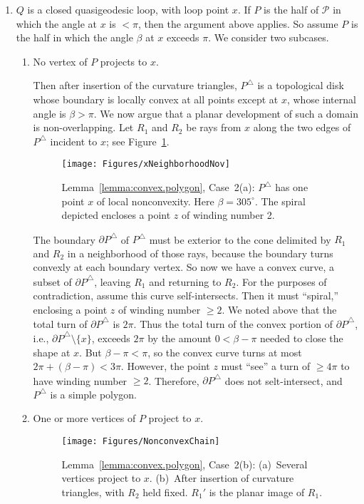 \pdfoutput=1  \documentclass[]{article}
\newcommand{\hide}[1]{}
\newcommand{\ABox}{
\raisebox{3pt}{\framebox[6pt]{\rule{6pt}{0pt}}}
}
\newenvironment{proof}{{\bf Proof:}}{\hfill\ABox}
\newcommand{\figlab}[1]{\label{fig:#1}}
\newcommand{\lemref}[1]{\ref{lemma:#1}}
\newcommand{\figref}[1]{\ref{fig:#1}}
\def\P{{\mathcal P}}
\def\o{{\omega}}
\def\b{{\beta}}
\def\bP{{\partial P}}
\begin{document}
\begin{proof}
\begin{enumerate}
\item $Q$ is a closed quasigeodesic loop, with loop point $x$.
If $P$ is the half of $\P$ in which the angle at $x$ is ${<}\pi$,
then the argument above applies.
So assume $P$ is the half in which the angle $\b$ at $x$ exceeds $\pi$.
We consider two subcases.

\begin{enumerate}
\item No vertex of $P$ projects to $x$.

Then after insertion of the curvature triangles, $P^\triangle$ is a topological
disk whose boundary is locally convex at all points except at $x$,
whose internal angle is $\b > \pi$.
We now argue that a planar development of such a domain is non-overlapping.
Let $R_1$ and $R_2$ be rays from $x$ along the two edges of $P^\triangle$
incident to $x$;
see Figure~\figref{xNeighborhoodNov}.
\begin{figure}[htbp]
\centering
\texttt{[image: Figures/xNeighborhoodNov]}
\caption{Lemma~\protect\lemref{convex.polygon}, Case~2(a): 
$P^\triangle$ has one point $x$ of local nonconvexity.
Here $\b=305^\circ$.
The spiral depicted encloses a point $z$ of winding number 2.
}
\figlab{xNeighborhoodNov}
\end{figure}
The boundary $\bP^\triangle$ of $P^\triangle$ must be exterior to the cone
delimited by $R_1$ and $R_2$ in a neighborhood of those rays,
because the boundary turns convexly at each boundary vertex.
So now we have a convex curve, a subset of $\bP^\triangle$,
leaving $R_1$ and returning to $R_2$.
For the purposes of contradiction, assume this curve self-intersects.
Then it must ``spiral,'' enclosing a point $z$ of winding number ${\ge}2$.
We noted above that the total turn of $\bP^\triangle$ is $2\pi$.
Thus the total turn of
the convex portion of $\bP^\triangle$, i.e.,
$\bP^\triangle \setminus \{x\}$,
exceeds $2\pi$ by the amount $0 <  \b-\pi$ needed
to close the shape at $x$.  
But $\b-\pi < \pi$, so
the convex curve
turns at most $2\pi+ (\b-\pi) < 3\pi$.
However, the point $z$ must ``see'' a turn of ${\ge}4\pi$ to have
winding number ${\ge}2$.
Therefore,  $\bP^\triangle$ does not selt-intersect,
and  $P^\triangle$ is a simple polygon.

\item One or more vertices of $P$ project to $x$.

\hide{
\begin{figure}[htbp]
\centering
\texttt{[image: Figures/quasicones]}
\caption{Lemma~\protect\lemref{convex.polygon}, Case~2(b): 
(a)~Several vertices project to $x$. (b,c,d)~Insertion of curvature triangles. Here
$\o(v_i)=10^\circ$ for $i{=}1,2,3$.
}
\figlab{quasicones}
\end{figure}
}\begin{figure}[htbp]
\centering
\texttt{[image: Figures/NonconvexChain]}
\caption{Lemma~\protect\lemref{convex.polygon}, Case~2(b): 
(a)~Several vertices project to $x$.
(b)~After insertion of curvature triangles, with $R_2$ held fixed. $R_1'$ is the
planar image of $R_1$.
}
\figlab{NonconvexChain}
\end{figure}



\end{enumerate}
\end{enumerate}
\end{proof}
\end{document}
